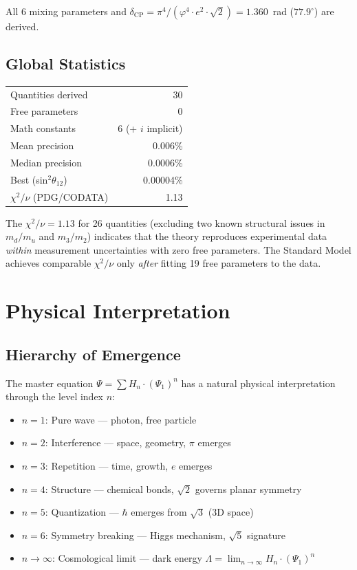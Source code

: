 \documentclass[12pt,a4paper]{article}
\begin{document}
All 6 mixing parameters and $\delta_\text{CP} = \pi^4/(\varphi^4 \cdot e^2 \cdot \sqrt{2}) = 1.360$~rad ($77.9^\circ$) are derived.

\subsection{Global Statistics}

\begin{center}
\begin{tabular}{lr}
\toprule
Quantities derived & 30 \\
Free parameters & 0 \\
Math constants & 6 (+ $i$ implicit) \\
Mean precision & 0.006\% \\
Median precision & 0.0006\% \\
Best (sin$^2\theta_{12}$) & 0.00004\% \\
$\chi^2/\nu$ (PDG/CODATA) & 1.13 \\
\bottomrule
\end{tabular}
\end{center}

The $\chi^2/\nu = 1.13$ for 26 quantities (excluding two known structural issues in $m_d/m_u$ and $m_3/m_2$) indicates that the theory reproduces experimental data \emph{within} measurement uncertainties with zero free parameters. The Standard Model achieves comparable $\chi^2/\nu$ only \emph{after} fitting 19 free parameters to the data.

\section{Physical Interpretation}

\subsection{Hierarchy of Emergence}

The master equation $\Psi = \sum H_n \cdot (\Psi_1)^n$ has a natural physical interpretation through the level index $n$:

\begin{itemize}
\item $n = 1$: Pure wave --- photon, free particle
\item $n = 2$: Interference --- space, geometry, $\pi$ emerges
\item $n = 3$: Repetition --- time, growth, $e$ emerges
\item $n = 4$: Structure --- chemical bonds, $\sqrt{2}$ governs planar symmetry
\item $n = 5$: Quantization --- $\hbar$ emerges from $\sqrt{3}$ (3D space)
\item $n = 6$: Symmetry breaking --- Higgs mechanism, $\sqrt{5}$ signature
\item $n \to \infty$: Cosmological limit --- dark energy $\Lambda = \lim_{n\to\infty} H_n \cdot (\Psi_1)^n$
\end{itemize}
\end{document}
